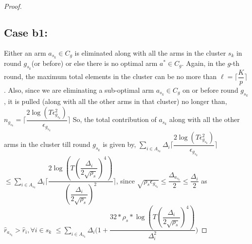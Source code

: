 \begin{proof}
\subsection{Case b1:} 
Either an arm $a_{s_{k}}\in C_{g}$ is eliminated along with all the arms in the cluster $s_{k}$ in round $g_{s_{k}}$(or before) or else there is no optimal arm $a^{*}\in C_{g}$. Again, in the $g$-th round, the maximum total elements in the cluster can be no more than $\ell=\bigg\lceil \dfrac{K}{p}\bigg\rceil$.
\newline
Also, since we are eliminating a sub-optimal arm $a_{s_{k}}\in C_{g}$ on or before round $g_{s_{k}}$, it is pulled (along with all the other arms in that cluster) no longer than,
\newline
\hspace*{4em}$n_{g_{s_{k}}}=\bigg\lceil\dfrac{2\log{(T\epsilon_{g_{s_{k}}}^{2})}}{\epsilon_{g_{s_{k}}}}\bigg\rceil$
\newline
So, the total contribution of $a_{s_{k}}$  along with all the other arms in the cluster till round $g_{s_{k}}$ is given by,
\newline
\hspace*{3em}$\sum_{i\in A_{s_{k}}}\Delta_{i}\bigg\lceil\dfrac{2\log{(T\epsilon_{g_{s_{k}}}^{2})}}{\epsilon_{g_{s_{k}}}}\bigg\rceil$
$\leq\sum_{i\in A_{s_{k}}}\Delta_{i}\bigg\lceil\dfrac{2\log{(T(\dfrac{\Delta_{i}}{2\sqrt{\rho_{s}}})^{4})}}{(\dfrac{\Delta_{i}}{2\sqrt{\rho_{s}}})^{2}}\bigg\rceil$, since $\sqrt{\rho_{s}\epsilon_{g_{s_{k}}}}\leq\dfrac{\Delta_{a_{s_{k}}}}{2}\leq  \dfrac{\Delta_{i}}{2}$ as $\hat{r}_{a_{s_{k}}}>\hat{r}_{i},\forall i\in s_{k}$
\newline
\hspace*{12em}$\leq\sum_{i\in A_{s_{k}}}\Delta_{i}\bigg(1+\dfrac{32*\rho_{s}*\log{(T(\dfrac{\Delta_{i}}{2\sqrt{\rho_{s}}})^{4})}}{\Delta_{i}^{2}}\bigg)$

\end{proof}

